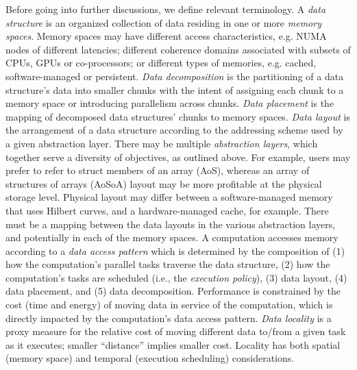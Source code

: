 Before going into further discussions, we define relevant terminology. 
%
%
A {\em data structure} is an organized collection of data residing in one or more {\em memory spaces}.
%
Memory spaces may have different access characteristics, e.g. NUMA nodes of different latencies; different coherence domains associated with subsets of CPUs, GPUs or co-processors; or different types of memories, e.g. cached, software-managed or persistent.
%
{\em Data decomposition} is the partitioning of a data structure's data into smaller chunks with the intent of assigning each chunk to a memory space or introducing parallelism across chunks. 
%
{\em Data placement} is the mapping of decomposed data structures' chunks to memory spaces.
%
%
%
{\em Data layout} is the arrangement of a data structure according to the addressing scheme used by a given abstraction layer. There may be multiple {\em abstraction layers}, which together serve a diversity of objectives, as outlined above.  For example, users may prefer to refer to struct members of an array (AoS), whereas an array of structures of arrays (AoSoA) layout may be more profitable at the physical storage level.  Physical layout may differ between a software-managed memory that uses Hilbert curves, and a hardware-managed cache, for example.  There must be a mapping between the data layouts in the various abstraction layers, and potentially in each of the memory spaces.
%
A computation accesses memory according to a {\em data access pattern} which is determined by the composition of (1) how the computation's parallel tasks traverse the data structure,
(2) how the computation's tasks are scheduled (i.e., the {\em execution policy}), 
(3) data layout,
(4) data placement, and
(5) data decomposition.
%
Performance is constrained by the cost (time and energy) of moving data in service of the computation, which is directly impacted by the computation's data access pattern.
%
{\em Data locality} is a proxy measure for the relative cost of moving different data to/from a given task as it executes; smaller ``distance'' implies smaller cost.
%
Locality has both spatial (memory space) and temporal (execution scheduling) considerations.

  
  
